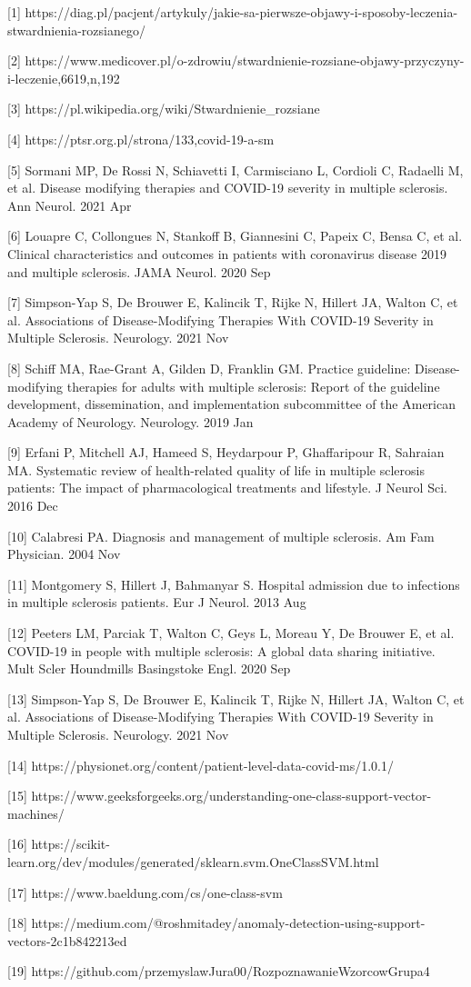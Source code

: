 \documentclass[a4paper,fleqn]{cas-dc}
\begin{document}
[1] https://diag.pl/pacjent/artykuly/jakie-sa-pierwsze-objawy-i-sposoby-leczenia-stwardnienia-rozsianego/

[2] https://www.medicover.pl/o-zdrowiu/stwardnienie-rozsiane-objawy-przyczyny-i-leczenie,6619,n,192

[3] https://pl.wikipedia.org/wiki/Stwardnienie\_rozsiane

[4] https://ptsr.org.pl/strona/133,covid-19-a-sm

[5] Sormani MP, De Rossi N, Schiavetti I, Carmisciano L, Cordioli C, Radaelli M, et al. Disease modifying therapies and COVID-19 severity in multiple sclerosis. Ann Neurol. 2021 Apr

[6] Louapre C, Collongues N, Stankoff B, Giannesini C, Papeix C, Bensa C, et al. Clinical characteristics and outcomes in patients with coronavirus disease 2019 and multiple sclerosis. JAMA Neurol. 2020 Sep

[7] Simpson-Yap S, De Brouwer E, Kalincik T, Rijke N, Hillert JA, Walton C, et al. Associations of Disease-Modifying Therapies With COVID-19 Severity in Multiple Sclerosis. Neurology. 2021 Nov

[8] Schiff MA, Rae-Grant A, Gilden D, Franklin GM. Practice guideline: Disease-modifying therapies for adults with multiple sclerosis: Report of the guideline development, dissemination, and implementation subcommittee of the American Academy of Neurology. Neurology. 2019 Jan

[9] Erfani P, Mitchell AJ, Hameed S, Heydarpour P, Ghaffaripour R, Sahraian MA. Systematic review of health-related quality of life in multiple sclerosis patients: The impact of pharmacological treatments and lifestyle. J Neurol Sci. 2016 Dec

[10] Calabresi PA. Diagnosis and management of multiple sclerosis. Am Fam Physician. 2004 Nov

[11] Montgomery S, Hillert J, Bahmanyar S. Hospital admission due to infections in multiple sclerosis patients. Eur J Neurol. 2013 Aug

[12] Peeters LM, Parciak T, Walton C, Geys L, Moreau Y, De Brouwer E, et al. COVID-19 in people with multiple sclerosis: A global data sharing initiative. Mult Scler Houndmills Basingstoke Engl. 2020 Sep

[13] Simpson-Yap S, De Brouwer E, Kalincik T, Rijke N, Hillert JA, Walton C, et al. Associations of Disease-Modifying Therapies With COVID-19 Severity in Multiple Sclerosis. 
Neurology. 2021 Nov

[14] https://physionet.org/content/patient-level-data-covid-ms/1.0.1/

[15] https://www.geeksforgeeks.org/understanding-one-class-support-vector-machines/

[16] https://scikit-learn.org/dev/modules/generated/sklearn.svm.OneClassSVM.html

[17] https://www.baeldung.com/cs/one-class-svm

[18] https://medium.com/@roshmitadey/anomaly-detection-using-support-vectors-2c1b842213ed

[19] https://github.com/przemyslawJura00/RozpoznawanieWzorcowGrupa4
\end{document}
